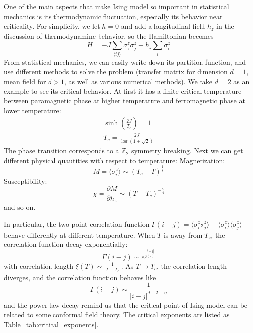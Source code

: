 \documentclass{article}
\theoremstyle{plain} \newtheorem{thm}{Theorem}[section]
\theoremstyle{definition} \newtheorem{df}{Definition}[section]
\theoremstyle{definition} \newtheorem{eg}{Example}
\theoremstyle{remark} \newtheorem*{rmk}{Remark}
\begin{document}
One of the main aspects that make Ising model so important in statistical mechanics is its thermodynamic fluctuation, especially its behavior near criticality. For simplicity, we let $h=0$ and add a longitudinal field $h_z$ in the  discussion of thermodynaminc behavior, so the Hamiltonian becomes
\begin{equation}
	H=-J\sum_{\langle ij\rangle}\sigma^z_i\sigma^z_j-h_z\sum_i\sigma_i^z
\end{equation}
From statistical mechanics, we can easily write down its partition function, and use different methods to solve the problem (transfer matrix for dimension $d=1$, mean field for $d>1$, as well as various numerical methods). We take $d=2$ as an example to see its critical behavior. At first it has a finite critical temperature between paramagnetic phase at higher temperature and ferromagnetic phase at lower temperature:
\begin{gather}
	\sinh\left(\frac{2J}{T_c}\right)=1\\
	T_c=\frac{2J}{\log(1+\sqrt{2})}
\end{gather} 
The phase transition corresponds to a $\mathbb{Z}_2$ symmetry breaking. Next we can get different physical quautities with respect to temperature:
Magnetization:
\begin{equation}
	M=\langle\sigma_i^z\rangle\sim(T_c-T)^{\frac{1}{8}}
\end{equation}
Susceptibility:
\begin{equation}
	\chi=\frac{\partial M}{\partial h_z}\sim(T-T_c)^{-\frac{7}{4}}
\end{equation}
and so on. 

In particular, the two-point correlation function $\Gamma(i-j)=\langle\sigma_i^z\sigma_j^z\rangle-\langle\sigma_i^z\rangle\langle\sigma_j^z\rangle$ behave differently at different temperature. When $T$ is away from $T_c$, the correlation function decay exponentially:
\begin{equation}
	\Gamma(i-j)\sim e^{\frac{|i-j|}{\xi(T)}}
\end{equation}
with correlation length $\xi(T)\sim\frac{1}{|T-T_c|}$. As $T\rightarrow T_c$, the correlation length diverges, and the correlation function behaves like
\begin{equation}
	\Gamma(i-j)\sim\frac{1}{|i-j|^{d-2+\eta}}
\end{equation}
and the power-law decay remind us that the critical point of Ising model can be related to some conformal field theory. The critical exponents are listed as Table~\ref{tab:critical_exponents}.
\end{document}
